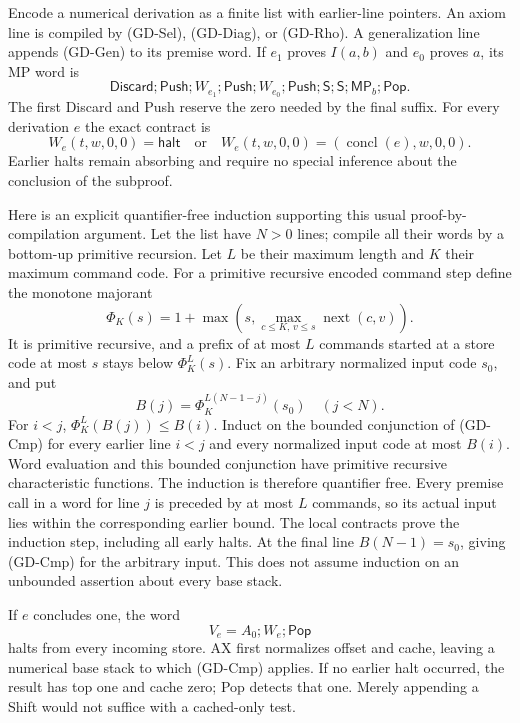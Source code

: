 Encode a numerical derivation as a finite list with earlier-line pointers.
An axiom line is compiled by (GD-Sel), (GD-Diag), or (GD-Rho).
A generalization line appends (GD-Gen) to its premise word.
If $e_1$ proves $I(a,b)$ and $e_0$ proves $a$, its MP word is
\[
 \mathsf{Discard};\mathsf{Push};W_{e_1};\mathsf{Push};
 W_{e_0};\mathsf{Push};\mathsf S;\mathsf S;
                         \mathsf{MP}_b;\mathsf{Pop}.
\]
The first Discard and Push reserve the zero needed by the final suffix.
For every derivation $e$ the exact contract is
\begin{equation}
 W_e(t,w,0,0)=\mathsf{halt}\quad\text{or}\quad
 W_e(t,w,0,0)=(\operatorname{concl}(e),w,0,0).              \tag{GD-Cmp}
\end{equation}
Earlier halts remain absorbing and require no special inference about
the conclusion of the subproof.

Here is an explicit quantifier-free induction supporting this usual
proof-by-compilation argument. Let the list have $N>0$ lines; compile
all their words by a bottom-up primitive recursion. Let $L$ be their
maximum length and $K$ their maximum command code. For a primitive
recursive encoded command step define the monotone majorant
\[
 \Phi_K(s)=1+\max\left(s,
     \max_{c\le K,\,v\le s}\operatorname{next}(c,v)\right).
\]
It is primitive recursive, and a prefix of at most $L$ commands started
at a store code at most $s$ stays below $\Phi_K^L(s)$.
Fix an arbitrary normalized input code $s_0$, and put
\[
 B(j)=\Phi_K^{L(N-1-j)}(s_0)\quad(j<N).
\]
For $i<j$, $\Phi_K^L(B(j))\le B(i)$. Induct on the bounded conjunction
of (GD-Cmp) for every earlier line $i<j$ and every normalized input
code at most $B(i)$. Word evaluation and this bounded conjunction have
primitive recursive characteristic functions. The induction is therefore
quantifier free. Every premise call in a word for line $j$ is preceded
by at most $L$ commands, so its actual input lies within the corresponding
earlier bound. The local contracts prove the induction step, including
all early halts. At the final line $B(N-1)=s_0$, giving (GD-Cmp) for
the arbitrary input. This does not assume induction on an unbounded
assertion about every base stack.

If $e$ concludes one, the word
\begin{equation}
                       V_e=A_0;W_e;\mathsf{Pop}             \tag{GD-Ref}
\end{equation}
halts from every incoming store. AX first normalizes offset and cache,
leaving a numerical base stack to which (GD-Cmp) applies. If no earlier
halt occurred, the result has top one and cache zero; Pop detects that
one. Merely appending a Shift would not suffice with a cached-only test.

